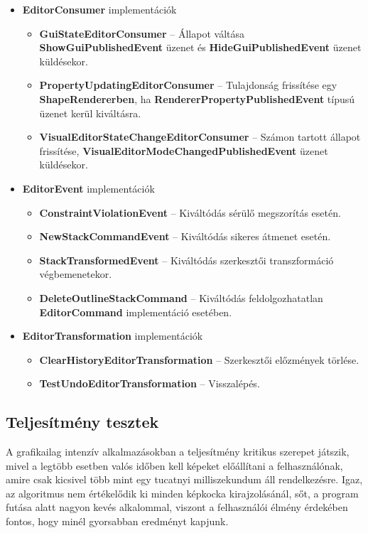 \begin{itemize}
\begin{itemize}
	\end{itemize}
	\item \textbf{EditorConsumer} implementációk
	\begin{itemize}
		\item \textbf{GuiStateEditorConsumer} -- Állapot váltása \textbf{ShowGuiPublishedEvent} üzenet és \textbf{HideGuiPublishedEvent} üzenet küldésekor.
		\item \textbf{PropertyUpdatingEditorConsumer} -- Tulajdonság frissítése egy \textbf{ShapeRendererben}, ha \textbf{RendererPropertyPublishedEvent} típusú üzenet kerül kiváltásra.
		\item \textbf{VisualEditorStateChangeEditorConsumer} -- Számon tartott állapot frissítése, \textbf{VisualEditorModeChangedPublishedEvent} üzenet küldésekor.
	\end{itemize}
	\item \textbf{EditorEvent} implementációk
	\begin{itemize}
		\item \textbf{ConstraintViolationEvent} -- Kiváltódás sérülő megszorítás esetén.
		\item \textbf{NewStackCommandEvent} -- Kiváltódás sikeres átmenet esetén.
		\item \textbf{StackTransformedEvent} -- Kiváltódás szerkesztői transzformáció végbemenetekor.
		\item \textbf{DeleteOutlineStackCommand} -- Kiváltódás feldolgozhatatlan \textbf{EditorCommand} implementáció esetében.
	\end{itemize}
	\item \textbf{EditorTransformation} implementációk
	\begin{itemize}
		\item \textbf{ClearHistoryEditorTransformation} -- Szerkesztői előzmények törlése.
		\item \textbf{TestUndoEditorTransformation} -- Visszalépés.
	\end{itemize}
\end{itemize}

\subsection{Teljesítmény tesztek}

A grafikailag intenzív alkalmazásokban a teljesítmény kritikus szerepet játszik, mivel a legtöbb esetben valós időben kell képeket előállítani a felhasználónak, amire csak kicsivel több mint egy tucatnyi milliszekundum áll rendelkezésre. Igaz, az algoritmus nem értékelődik ki minden képkocka kirajzolásánál, sőt, a program futása alatt nagyon kevés alkalommal, viszont a felhasználói élmény érdekében fontos, hogy minél gyorsabban eredményt kapjunk.

